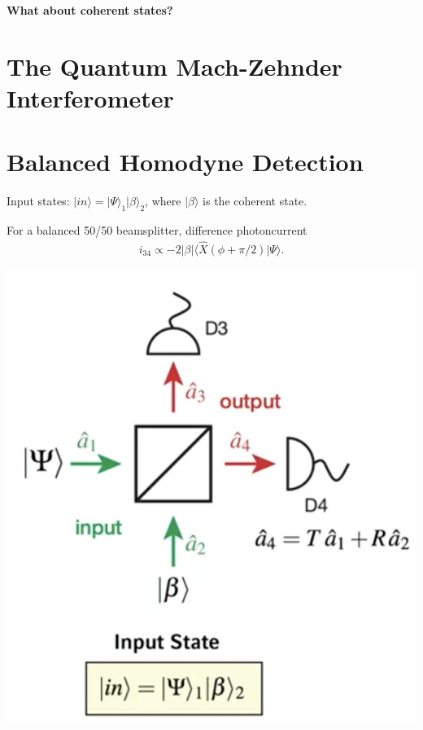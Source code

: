 \documentclass[../../note.tex]{subfiles}
\begin{document}
\textbf{What about coherent states?}
\section{The Quantum Mach-Zehnder Interferometer}

\section{Balanced Homodyne Detection}
Input states: $\vert in \rangle = \vert \Psi \rangle_1 \vert \beta \rangle_2$, where $\vert \beta \rangle$ is the coherent state.

\begin{lemma}
    For a balanced 50/50 beamsplitter, difference photoncurrent
    \begin{align}
        i_{34} \propto -2 \vert \beta \vert \langle \hat{X} \left(\phi + \pi/2 \right) \vert \Psi \rangle.
    \end{align}
\end{lemma}
\includegraphics[scale=0.30]{../figures/difference photoncurrent.png}
\end{document}

